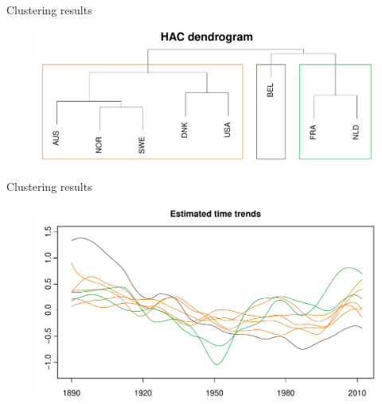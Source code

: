 \documentclass[10pt, handout]{beamer}
\begin{document}
\begin{frame}{Clustering results}
	\begin{figure}
		\includegraphics[width=1\textwidth]{plots//VOC/dendrogram}
	\end{figure}
\end{frame}

\begin{frame}{Clustering results}
	\begin{figure}
		\includegraphics[width=1\textwidth]{plots//VOC/all_clusters}
	\end{figure}
\end{frame}

\end{document}
